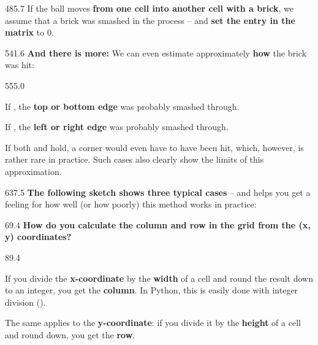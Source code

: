 \documentclass{aslab}
\begin{document}
\begin{region}[pitch=14.25]{485.7}
If the ball moves \textbf{from one cell into another cell with a brick}, we
assume that a brick was smashed in the process -- and \textbf{set the entry in
the matrix}  to 0.
\end{region}

\begin{region}{541.6}
\textbf{And there is more:} We can even estimate approximately \textbf{how}
the brick was hit:
\end{region}

\begin{region}[pitch=13.8]{555.0}
\begin{dashlist}
\item If , the \textbf{top or bottom edge} was probably smashed
  through.
\item If , the \textbf{left or right edge} was probably smashed
  through.
\item If both  and  hold, a corner would even
  have to have been hit, which, however, is rather rare in practice. Such cases
  also clearly show the limits of this approximation.
\end{dashlist}
\end{region}

\begin{region}[pitch=13.3]{637.5}
\textbf{The following sketch shows three typical cases} -- and helps you get
a feeling for how well (or how poorly) this method works in practice:
\end{region}


\nextpage
\begin{region}{69.4}
\textbf{How do you calculate the column and row in the grid from the
(x,\,y) coordinates?}
\end{region}

\begin{region}[pitch=14.6]{89.4}
\begin{dashlist}
\item If you divide the \textbf{x-coordinate} by the \textbf{width} of a cell
  and round the result down to an integer, you get the \textbf{column}. In
  Python, this is easily done with integer division (\code{//}).
\item The same applies to the \textbf{y-coordinate}: if you divide it by the
  \textbf{height} of a cell and round down, you get the \textbf{row}.
\end{dashlist}
\end{region}
\end{document}
